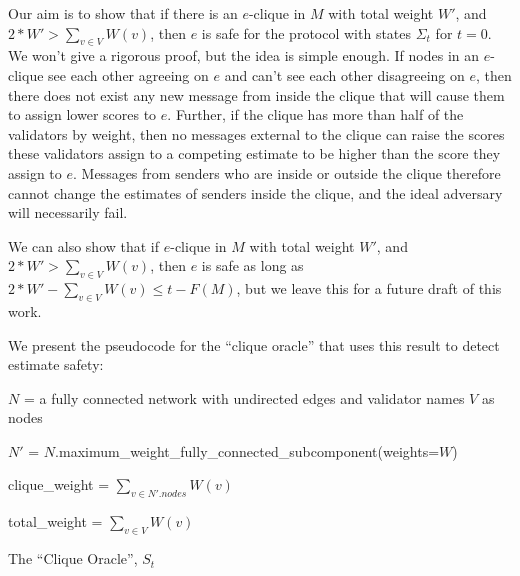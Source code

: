 \documentclass{article}
\theoremstyle{definition}
\begin{document}
Our aim is to show that if there is an $e$-clique in $M$ with total weight $W'$, and $2*W' > \sum_{v\in V} W(v)$, then $e$ is safe for the protocol with states $\Sigma_t$ for $t = 0$. We won't give a rigorous proof, but the idea is simple enough. If nodes in an $e$-clique see each other agreeing on $e$ and can't see each other disagreeing on $e$, then there does not exist any new message from inside the clique that will cause them to assign lower scores to $e$. Further, if the clique has more than half of the validators by weight, then no messages external to the clique can raise the scores these validators assign to a competing estimate to be higher than the score they assign to $e$. Messages from senders who are inside or outside the clique therefore cannot change the estimates of senders inside the clique, and the ideal adversary will necessarily fail.

We can also show that if $e$-clique in $M$ with total weight $W'$, and $2*W' > \sum_{v\in V} W(v)$, then $e$ is safe as long as $2*W' - \sum_{v\in V} W(v) \leq t - F(M)$, but we leave this for a future draft of this work.

We present the pseudocode for the ``clique oracle'' that uses this result to detect estimate safety:

\begin{algorithm}[H]



  $N$ = a fully connected network with undirected edges and validator names $V$ as nodes


  $N'$ = $N$.maximum\_weight\_fully\_connected\_subcomponent(weights=$W$)

  clique\_weight = $\sum_{v \in N'.nodes} W(v)$

  total\_weight = $\sum_{v \in V} W(v)$



\caption{The ``Clique Oracle'', $S_t$}
\end{algorithm}
\end{document}
